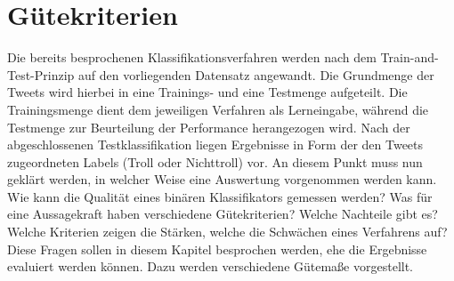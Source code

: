 \section{Gütekriterien}\label{metrics}\raggedbottom
Die bereits besprochenen Klassifikationsverfahren werden nach dem \glqq Train-and-Test\grqq-Prinzip auf den vorliegenden Datensatz angewandt. Die Grundmenge der Tweets wird hierbei in eine Trainings- und eine Testmenge aufgeteilt. Die Trainingsmenge dient dem jeweiligen Verfahren als Lerneingabe, während die Testmenge zur Beurteilung der Performance herangezogen wird. Nach der abgeschlossenen Testklassifikation liegen Ergebnisse in Form der den Tweets zugeordneten Labels (Troll oder Nichttroll) vor. An diesem Punkt muss nun geklärt werden, in welcher Weise eine Auswertung vorgenommen werden kann. Wie kann die Qualität eines binären Klassifikators gemessen werden? Was für eine Aussagekraft haben verschiedene Gütekriterien? Welche Nachteile gibt es? Welche Kriterien zeigen die Stärken, welche die Schwächen eines Verfahrens auf? Diese Fragen sollen in diesem Kapitel besprochen werden, ehe die Ergebnisse evaluiert werden können. Dazu werden verschiedene Gütemaße \citep{perfmetrics2015} vorgestellt. 
